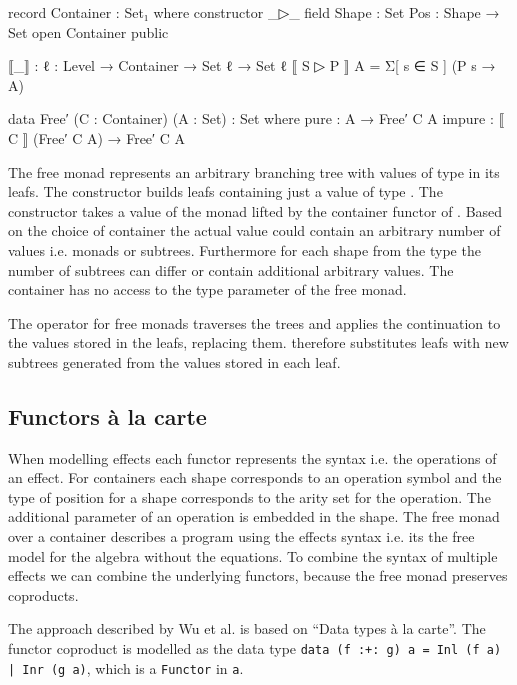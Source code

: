 \begin{code}[hide]
record Container : Set₁ where
  constructor _▷_
  field
    Shape : Set
    Pos : Shape → Set
open Container public

⟦_⟧ : {ℓ : Level} → Container → Set ℓ → Set ℓ
⟦ S ▷ P ⟧ A = Σ[ s ∈ S ] (P s → A)
\end{code}
\begin{code}
data Free′ (C : Container) (A : Set) : Set where
  pure : A → Free′ C A
  impure : ⟦ C ⟧ (Free′ C A) → Free′ C A
\end{code}
The free monad represents an arbitrary branching tree with values of type
 in its leafs.
The  constructor builds leafs containing just
a value of type .
The  constructor takes a value of the
 monad lifted by the container functor of .
Based on the choice of container the actual value could contain an arbitrary
number of values i.e.  monads or subtrees.
Furthermore for each shape from the  type the number of
subtrees can differ or contain additional arbitrary values.
The container has no access to the type parameter of the free monad.

The \AgdaFunction{>>=} operator for free monads traverses the trees and applies
the continuation to the values stored in the leafs, replacing them.
\AgdaFunction{>>=} therefore substitutes leafs with new subtrees generated from
the values stored in each leaf.

\subsection{Functors {\`{a}} la carte}

When modelling effects each functor represents the syntax i.e. the operations of
an effect.
For containers each shape corresponds to an operation symbol and the
type of position for a shape corresponds to the arity set for the operation.
The additional parameter of an operation is embedded in the shape.
The free monad over a container describes a program using the effects syntax
i.e. its the free model for the algebra without the equations.
To combine the syntax of multiple effects we can combine the underlying
functors, because the free monad preserves coproducts.


The approach described by Wu et al. is based on ``Data types {\`{a}} la
carte''\cite{DBLP:journals/jfp/Swierstra08}.
The functor coproduct is modelled as the data type \texttt{data (f :+: g) a =
  Inl (f a) | Inr (g a)}, which is a \texttt{Functor} in \texttt{a}.

